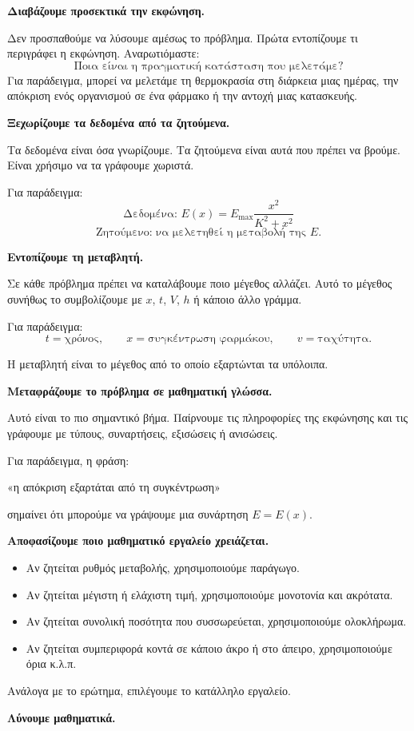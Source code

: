 \begin{alist}
\item \textbf{Διαβάζουμε προσεκτικά την εκφώνηση.}

Δεν προσπαθούμε να λύσουμε αμέσως το πρόβλημα. Πρώτα εντοπίζουμε τι περιγράφει η εκφώνηση. Αναρωτιόμαστε:
\[
\text{Ποια είναι η πραγματική κατάσταση που μελετάμε?}
\]
Για παράδειγμα, μπορεί να μελετάμε τη θερμοκρασία στη διάρκεια μιας ημέρας, την απόκριση ενός οργανισμού σε ένα φάρμακο ή την αντοχή μιας κατασκευής.

\item \textbf{Ξεχωρίζουμε τα δεδομένα από τα ζητούμενα.}

Τα δεδομένα είναι όσα γνωρίζουμε. Τα ζητούμενα είναι αυτά που πρέπει να βρούμε. Είναι χρήσιμο να τα γράφουμε χωριστά.

Για παράδειγμα:
\[
\text{Δεδομένα: } E(x)=E_{\max}\frac{x^2}{K^2+x^2}
\]
\[
\text{Ζητούμενο: να μελετηθεί η μεταβολή της } E.
\]

\item \textbf{Εντοπίζουμε τη μεταβλητή.}

Σε κάθε πρόβλημα πρέπει να καταλάβουμε ποιο μέγεθος αλλάζει. Αυτό το μέγεθος συνήθως το συμβολίζουμε με \(x\), \(t\), \(V\), \(h\) ή κάποιο άλλο γράμμα.

Για παράδειγμα:
\[
t=\text{χρόνος},\qquad
x=\text{συγκέντρωση φαρμάκου},\qquad
v=\text{ταχύτητα}.
\]

Η μεταβλητή είναι το μέγεθος από το οποίο εξαρτώνται τα υπόλοιπα.

\item \textbf{Μεταφράζουμε το πρόβλημα σε μαθηματική γλώσσα.}

Αυτό είναι το πιο σημαντικό βήμα. Παίρνουμε τις πληροφορίες της εκφώνησης και τις γράφουμε με τύπους, συναρτήσεις, εξισώσεις ή ανισώσεις.

Για παράδειγμα, η φράση:
\begin{center}
«η απόκριση εξαρτάται από τη συγκέντρωση»
\end{center}
σημαίνει ότι μπορούμε να γράψουμε μια συνάρτηση $E=E(x).$
\item \textbf{Αποφασίζουμε ποιο μαθηματικό εργαλείο χρειάζεται.}
\begin{itemize}
\item Αν ζητείται ρυθμός μεταβολής, χρησιμοποιούμε παράγωγο.
\item Αν ζητείται μέγιστη ή ελάχιστη τιμή, χρησιμοποιούμε μονοτονία και ακρότατα.
\item Αν ζητείται συνολική ποσότητα που συσσωρεύεται, χρησιμοποιούμε ολοκλήρωμα.
\item Αν ζητείται συμπεριφορά κοντά σε κάποιο άκρο ή στο άπειρο, χρησιμοποιούμε όρια κ.λ.π.
\end{itemize}
Ανάλογα με το ερώτημα, επιλέγουμε το κατάλληλο εργαλείο.
\item \textbf{Λύνουμε μαθηματικά.}


\end{alist}
